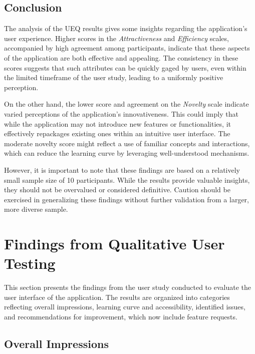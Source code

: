 \subsection*{Conclusion}

The analysis of the UEQ results gives some insights regarding the application's user experience. 
Higher scores in the \emph{Attractiveness} and \emph{Efficiency} scales, accompanied by high agreement among participants, indicate that these aspects of the application are both effective and appealing. 
The consistency in these scores suggests that such attributes can be quickly gaged by users, even within the limited timeframe of the user study, leading to a uniformly positive perception.

On the other hand, the lower score and agreement on the \emph{Novelty} scale indicate varied perceptions of the application’s innovativeness. 
This could imply that while the application may not introduce new features or functionalities, it effectively repackages existing ones within an intuitive user interface. 
The moderate novelty score might reflect a use of familiar concepts and interactions, which can reduce the learning curve by leveraging well-understood mechanisms.

However, it is important to note that these findings are based on a relatively small sample size of 10 participants. 
While the results provide valuable insights, they should not be overvalued or considered definitive. 
Caution should be exercised in generalizing these findings without further validation from a larger, more diverse sample.

\section{Findings from Qualitative User Testing}
\label{sec:result:qualitative}

This section presents the findings from the user study conducted to evaluate the user interface of the application. The results are organized into categories reflecting overall impressions, learning curve and accessibility, identified issues, and recommendations for improvement, which now include feature requests.

\subsection*{Overall Impressions}
\label{sec:results:overall_impressions}


